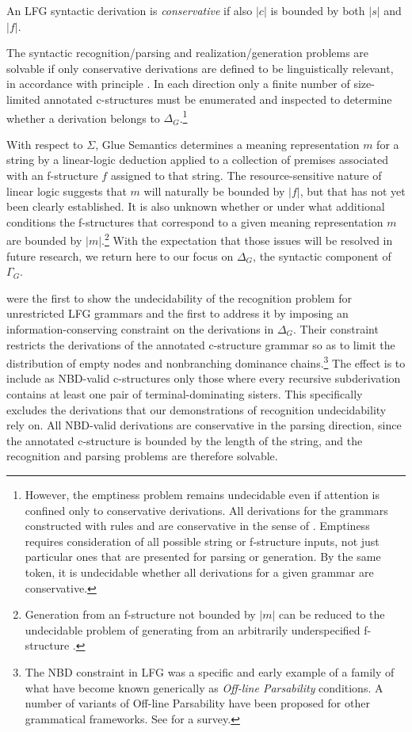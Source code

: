 \documentclass[output=paper,hidelinks]{langscibook}
\begin{document}
\ea\label{cbounds}
     An LFG syntactic derivation  is \textit{conservative} if also  $|c|$ is bounded by both $|s|$ and $|f|$.
\z

\noindent The syntactic recognition/parsing and realization/generation problems are solvable if only conservative derivations are defined to be linguistically relevant, in accordance with principle . In each direction only a finite number of size-limited annotated c-structures must be enumerated and inspected to determine whether a derivation belongs to $\Delta_G$.\footnote{However, the emptiness problem remains undecidable even if attention is confined only to conservative derivations.  All derivations for the grammars constructed with rules  and  are conservative in the sense of . Emptiness requires consideration of all possible string or f-structure inputs, not just particular ones that are presented for parsing or generation. By the same token, it is undecidable whether all derivations for a given grammar are conservative.}

With respect to $\Sigma$, Glue Semantics \citep{dalrympleetal93,Dalrymple:Glue} determines a meaning representation $m$ for a string by a  linear-logic deduction applied to a collection of premises associated with an  f-structure $f$ assigned to that string. The resource-sensitive nature of linear logic suggests that $m$ will naturally be bounded by $|f|$, but that has not yet been clearly established. It is also unknown whether or under what additional conditions the f-structures that correspond to a given meaning representation $m$ are bounded by $|m|$.\footnote{Generation from an f-structure not bounded by $|m|$ can be reduced to the undecidable problem of generating from an arbitrarily underspecified f-structure \citep{Wedekind99}.}  With the expectation that those issues will be resolved in future research, we return here to our focus on $\Delta_G$, the syntactic component of $\Gamma_G$.

\citet{kaplanbresnan82} were the first to show the undecidability of the recognition problem for unrestricted LFG grammars and the first to address it by imposing an information-conserving constraint on the derivations in $\Delta_G$.  Their constraint restricts the derivations of the annotated c-structure grammar so as to limit the distribution of empty nodes and nonbranching dominance  chains.\footnote{The NBD constraint in LFG was a specific and early example of a family of what have become known generically as \textit{Off-line Parsability} conditions.  A number of variants of Off-line Parsability have been proposed for other grammatical frameworks.  See \cite{Jaeger2005} for a survey.}  The effect is to include as NBD-valid c-structures only those where every recursive subderivation contains at least one pair of terminal-dominating sisters. This specifically excludes the derivations that our demonstrations of recognition undecidability rely on.  All NBD-valid derivations are conservative in the parsing direction, since the annotated c-structure is bounded  by the length of the string, and the recognition and parsing problems are therefore solvable.  
\end{document}
